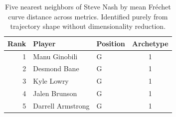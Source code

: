 \begin{table}[htbp]
  \centering\small
  \begin{tabular}{rllc}
    \toprule
    Rank & Player & Position & Archetype \\
    \midrule
    1 & Manu Ginobili & G & 1 \\
    2 & Desmond Bane & G & 1 \\
    3 & Kyle Lowry & G & 1 \\
    4 & Jalen Brunson & G & 1 \\
    5 & Darrell Armstrong & G & 1 \\
    \bottomrule
  \end{tabular}
  \caption{Five nearest neighbors of Steve Nash by mean Fr\'{e}chet curve distance across metrics. Identified purely from trajectory shape without dimensionality reduction.}
  \label{tab:Steve_Nash_frechet_curve_neighbors}
\end{table}

